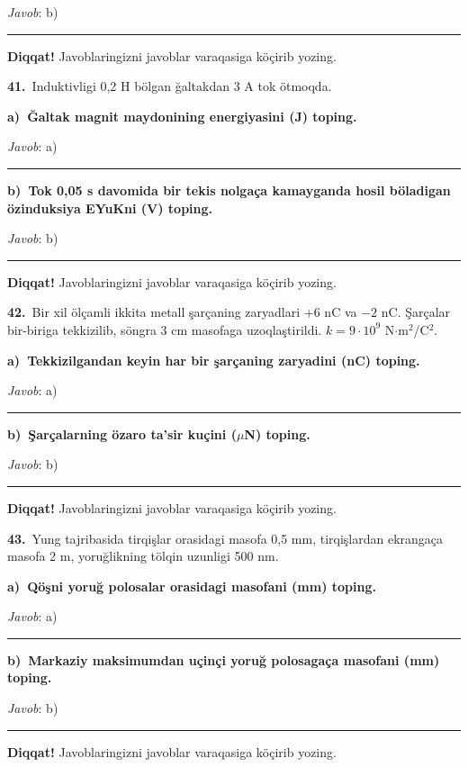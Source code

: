 \documentclass[11pt,a4paper]{article}
\newcommand{\blank}{\rule{5cm}{0.4pt}}
\begin{document}
\noindent\textit{Javob}: b)\ \blank\par
\medskip\noindent\textbf{Diqqat!} Javoblaringizni javoblar varaqasiga köçirib yozing.\par\vspace{10pt}
\noindent\textbf{41.}\ Induktivligi 0,2 H bölgan ğaltakdan 3 A tok ötmoqda.\par\smallskip
\medskip\noindent\textbf{a)\ Ğaltak magnit maydonining energiyasini (J) toping.}\par
\noindent\textit{Javob}: a)\ \blank\par
\medskip\noindent\textbf{b)\ Tok 0,05 s davomida bir tekis nolgaça kamayganda hosil böladigan özinduksiya EYuKni (V) toping.}\par
\noindent\textit{Javob}: b)\ \blank\par
\medskip\noindent\textbf{Diqqat!} Javoblaringizni javoblar varaqasiga köçirib yozing.\par\vspace{10pt}
\noindent\textbf{42.}\ Bir xil ölçamli ikkita metall şarçaning zaryadlari $+6$ nC va $-2$ nC. Şarçalar bir-biriga tekkizilib, söngra 3 cm masofaga uzoqlaştirildi. $k=9\cdot10^9$ N$\cdot$m$^2$/C$^2$.\par\smallskip
\medskip\noindent\textbf{a)\ Tekkizilgandan keyin har bir şarçaning zaryadini (nC) toping.}\par
\noindent\textit{Javob}: a)\ \blank\par
\medskip\noindent\textbf{b)\ Şarçalarning özaro ta’sir kuçini ($\mu$N) toping.}\par
\noindent\textit{Javob}: b)\ \blank\par
\medskip\noindent\textbf{Diqqat!} Javoblaringizni javoblar varaqasiga köçirib yozing.\par\vspace{10pt}
\noindent\textbf{43.}\ Yung tajribasida tirqişlar orasidagi masofa 0,5 mm, tirqişlardan ekrangaça masofa 2 m, yoruğlikning tölqin uzunligi 500 nm.\par\smallskip
\medskip\noindent\textbf{a)\ Qöşni yoruğ polosalar orasidagi masofani (mm) toping.}\par
\noindent\textit{Javob}: a)\ \blank\par
\medskip\noindent\textbf{b)\ Markaziy maksimumdan uçinçi yoruğ polosagaça masofani (mm) toping.}\par
\noindent\textit{Javob}: b)\ \blank\par
\medskip\noindent\textbf{Diqqat!} Javoblaringizni javoblar varaqasiga köçirib yozing.\par\vspace{10pt}
\end{document}
